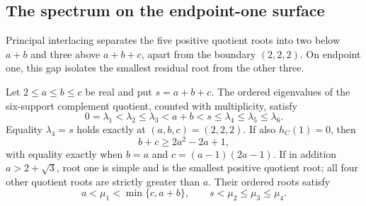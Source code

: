 \subsection{The spectrum on the endpoint-one surface}

Principal interlacing separates the five positive quotient roots into
two below $a+b$ and three above $a+b+c$, apart from the boundary
$(2,2,2)$. On endpoint one, this gap
isolates the smallest residual root from the other three.

\begin{theorem}
\label{thm:endpoint-one-spectrum}
Let $2\leq a\leq b\leq c$ be real and put $s=a+b+c$. The ordered eigenvalues of the
six-support complement quotient, counted with multiplicity, satisfy
\[
 0=\lambda_1<\lambda_2\leq\lambda_3<a+b<s
 \leq\lambda_4\leq\lambda_5\leq\lambda_6.
\]
Equality $\lambda_4=s$ holds exactly at $(a,b,c)=(2,2,2)$.
If also $h_C(1)=0$, then
\[
 b+c\geq2a^2-2a+1,
\]
with equality exactly when $b=a$ and $c=(a-1)(2a-1)$.
If in addition $a>2+\sqrt3$, root one is
simple and is the smallest positive quotient root; all four other
quotient roots are strictly greater than $a$. Their ordered roots satisfy
\[
 a<\mu_1<\min\{c,a+b\},\qquad s<\mu_2\leq\mu_3\leq\mu_4.
\]
\end{theorem}

